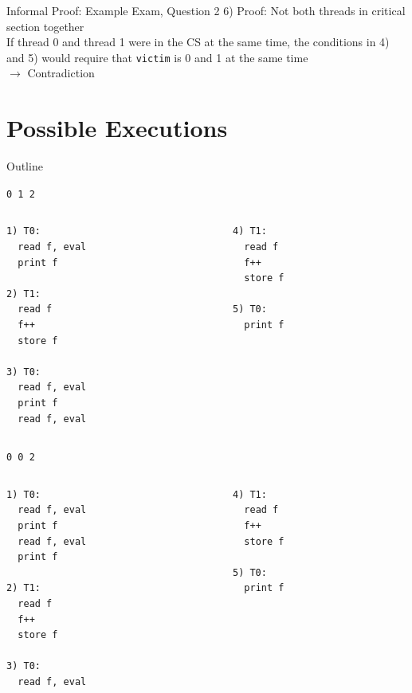 \begin{frame}{Informal Proof: Example Exam, Question 2}
  6) Proof: Not both threads in critical section together \\[2ex]

  If thread 0 and thread 1 were in the CS at the same time, the
  conditions in 4) and 5) would require that \lstinline!victim! is 0
  and 1 at the same time\\[3ex]

  $\rightarrow$ Contradiction
\end{frame}


\section{Possible Executions}

\begin{frame}{Outline}
  \tableofcontents[current]
\end{frame}

\begin{frame}[fragile]{\lstinline{0 1 2}}
  \begin{columns}[t]
    \begin{column}{0.5\textwidth}
  \begin{lstlisting}
1) T0:
  read f, eval 
  print f

2) T1: 
  read f
  f++
  store f

3) T0: 
  read f, eval
  print f
  read f, eval
  \end{lstlisting}
    \end{column}
    \begin{column}{0.5\textwidth}
  \begin{lstlisting}
4) T1:
  read f
  f++
  store f

5) T0:
  print f
  \end{lstlisting}
    \end{column}
  \end{columns}
\end{frame}

\begin{frame}[fragile]{\lstinline{0 0 2}}
  \begin{columns}[t]
    \begin{column}{0.5\textwidth}
  \begin{lstlisting}
1) T0:
  read f, eval 
  print f
  read f, eval
  print f

2) T1: 
  read f
  f++
  store f

3) T0: 
  read f, eval
  \end{lstlisting}
    \end{column}
    \begin{column}{0.5\textwidth}
  \begin{lstlisting}
4) T1:
  read f
  f++
  store f

5) T0:
  print f
  \end{lstlisting}
    \end{column}
  \end{columns}
\end{frame}

